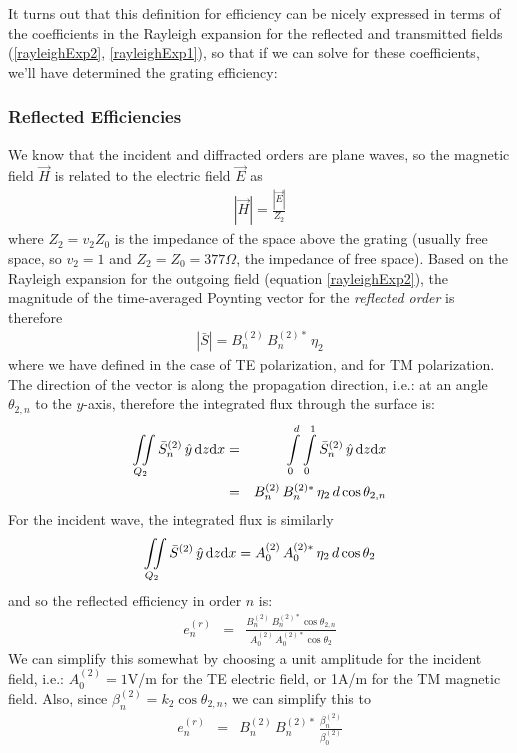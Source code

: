 It turns out that this definition for efficiency can be nicely expressed in terms of the coefficients in the Rayleigh expansion for the reflected and transmitted fields (\ref{rayleighExp2}, \ref{rayleighExp1}), so that if we can solve for these coefficients, we'll have determined the grating efficiency:
\subsubsection{Reflected Efficiencies}
We know that the incident and diffracted orders are plane waves, so the magnetic field $\vec H$ is related to the electric field $\vec E$ as
\begin{eqnarray}
\left| \vec H \right| = \frac{\left| \vec E \right|}{Z_2}
\end{eqnarray}
where $Z_2 = v_2 Z_0$ is the impedance of the space above the grating (usually free space, so $v_2=1$ and $Z_2 = Z_0 = 377\Omega$, the impedance of free space). Based on the Rayleigh expansion for the outgoing field (equation \ref{rayleighExp2}), the magnitude of the time-averaged Poynting vector for the \emph{reflected order} is therefore
\begin{eqnarray}
\left| \bar S \right| = B_n^{(2)} \, B_n^{(2)\ast} \, \eta_2
\end{eqnarray}
where we have defined  in the case of TE polarization, and  for TM polarization.  The direction of the vector is along the propagation direction, i.e.: at an angle $\theta_{2,n}$ to the $y$-axis, therefore the integrated flux through the surface is:
\begin{eqnarray}
\iint \limits_{Q_2} \bar S_n^{(2)} \, \hat y \, \mathrm{d} z \mathrm{d} x &=& \int \limits_0^d \int \limits_0^1 \bar S_n^{(2)} \, \hat y \, \mathrm{d} z \mathrm{d} x \\
&=& B_n^{(2)} \, B_n^{(2)\ast} \, \eta_2 \, d \cos \theta_{2,n} 
\end{eqnarray}
For the incident wave, the integrated flux is similarly 
\begin{eqnarray}
\iint \limits_{Q_2} \bar S^{(2)} \, \hat y \, \mathrm{d} z \mathrm{d} x = A_0^{(2)} \, A_0^{(2)\ast} \, \eta_2 \, d \cos \theta_{2} 
\end{eqnarray}
and so the reflected efficiency in order $n$ is:
\begin{eqnarray}
e_n^{(r)} &=& \frac{    B_n^{(2)} \, B_n^{(2)\ast} \cos \theta_{2,n}       }{    A_0^{(2)} \, A_0^{(2)\ast}  \cos \theta_{2}     }
\end{eqnarray}
We can simplify this somewhat by choosing a unit amplitude for the incident field, i.e.: $A_0^{(2)} = 1$V/m for the TE electric field, or 1A/m for the TM magnetic field. Also, since $\beta_n^{(2)} = k_2 \cos \theta_{2,n}$, we can simplify this to
\begin{eqnarray}
e_n^{(r)} &=& B_n^{(2)} \, B_n^{(2)\ast} \, \frac{     \beta_n^{(2)}       }{    \beta_0^{(2)}      }
\end{eqnarray}


